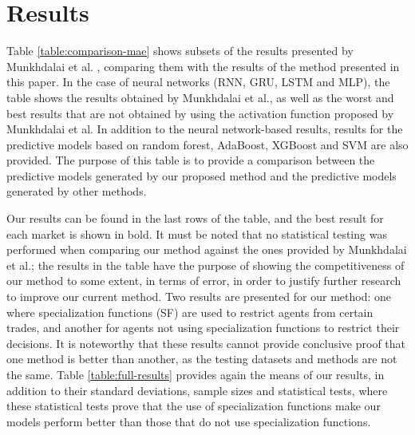 \documentclass{ieeeaccess}
\begin{document}
\section{Results}
\label{section:results}

Table \ref{table:comparison-mae} shows
subsets of the results presented by Munkhdalai et
al. \cite{Munkhdalai2019}, comparing them with the results of the
method presented in this paper. In the case of neural networks (RNN, GRU,
LSTM and MLP), the table shows the results obtained by Munkhdalai et
al., as well as the worst and best results that are not obtained
by
using the activation function proposed by Munkhdalai et al. In
addition to the neural network-based results, results for the
predictive models based on random forest, AdaBoost, XGBoost and
SVM are also provided. The purpose of this table
is to provide a comparison between the predictive models generated by
our proposed method and the predictive models generated by other
methods.

Our results can be found in the last rows of the table, and the best
result for each market is shown in bold. It must be noted that no
statistical testing was performed when comparing our method against
the ones provided by Munkhdalai et al.; the results in the table
have the purpose of showing the competitiveness of our method to some
extent, in terms of error, in order to justify further research to
improve our current method. Two results are presented for
our method: one where specialization functions (SF) are used to restrict agents
from certain trades, and another for agents not using specialization
functions to restrict their decisions. It is noteworthy that these
results cannot provide conclusive proof that one method is better than
another, as the testing datasets and methods are not the same. Table
\ref{table:full-results} provides again the means of our results, in
addition to their standard deviations, sample sizes and statistical
tests, where these statistical tests prove that the use of specialization
functions make our models perform better than those that do not use
specialization functions.

\end{document}
